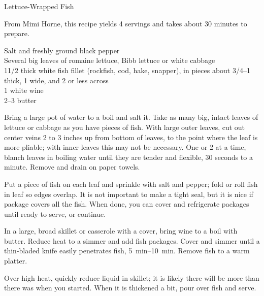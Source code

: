 \begin{entry}{Lettuce-Wrapped Fish}

\begin{open}
  From Mimi Horne, this recipe yields 4 servings and takes about 30 minutes to
  prepare.
\end{open}
\begin{ingredients}
    Salt and freshly ground black pepper\\
    Several big leaves of romaine lettuce, Bibb lettuce or white cabbage\\
    1\SI{1/2}{\pound} thick white fish fillet (rockfish, cod, hake, snapper), in
    pieces about \SIrange[range-phrase={ to }]{3/4}{1}{\inch} thick,
    \SI{1}{\inch} wide, and \SI{2}{\inch} or less across\\
    \SI{1}{\cup} white wine\\
    \SIrange[range-phrase={ to }]{2}{3}{\tblspoon} butter
\end{ingredients}
Bring a large pot of water to a boil and salt it. Take as many big, intact
leaves of lettuce or cabbage as you have pieces of fish. With large outer
leaves, cut out center veins 2 to 3 inches up from bottom of leaves, to the
point where the leaf is more pliable; with inner leaves this may not be
necessary. One or 2 at a time, blanch leaves in boiling water until they are
tender and flexible, 30 seconds to a minute. Remove and drain on paper towels.

Put a piece of fish on each leaf and sprinkle with salt and pepper; fold or roll
fish in leaf so edges overlap. It is not important to make a tight seal, but it
is nice if package covers all the fish. When done, you can cover and refrigerate
packages until ready to serve, or continue.

In a large, broad skillet or casserole with a cover, bring wine to a boil with
butter. Reduce heat to a simmer and add fish packages. Cover and simmer until a
thin-bladed knife easily penetrates fish, \SIrange{5}{10}{\minute}. Remove fish
to a warm platter.

Over high heat, quickly reduce liquid in skillet; it is likely there will be
more than there was when you started. When it is thickened a bit, pour over fish
and serve.
\end{entry}

